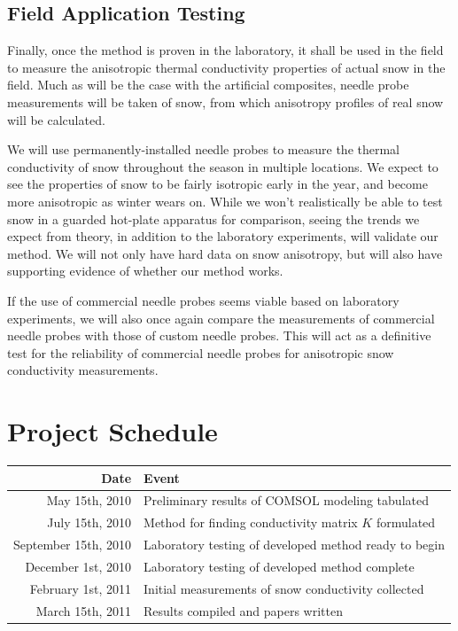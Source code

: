 \documentclass[12pt, letterpaper]{article}
\begin{document}
\subsection{Field Application Testing}

Finally, once the method is proven in the laboratory, it shall be used in the field to measure the anisotropic thermal conductivity properties of actual snow in the field. Much as will be the case with the artificial composites, needle probe measurements will be taken of snow, from which anisotropy profiles of real snow will be calculated.

We will use permanently-installed needle probes to measure the thermal conductivity of snow throughout the season in multiple locations. We expect to see the properties of snow to be fairly isotropic early in the year, and become more anisotropic as winter wears on. While we won't realistically be able to test snow in a guarded hot-plate apparatus for comparison, seeing the trends we expect from theory, in addition to the laboratory experiments, will validate our method. We will not only have hard data on snow anisotropy, but will also have supporting evidence of whether our method works.

If the use of commercial needle probes seems viable based on laboratory experiments, we will also once again compare the measurements of commercial needle probes with those of custom needle probes. This will act as a definitive test for the reliability of commercial needle probes for anisotropic snow conductivity measurements.

\pagebreak
\nocite{*}



\pagebreak

\section*{Project Schedule}
\begin{center}
\begin{tabular}{r | l}
Date & Event\\
\hline
May 15th, 2010 & Preliminary results of COMSOL modeling tabulated\\
July 15th, 2010 & Method for finding conductivity matrix \(K\) formulated\\
September 15th, 2010 & Laboratory testing of developed method ready to begin\\
December 1st, 2010 & Laboratory testing of developed method complete\\
February 1st, 2011 & Initial measurements of snow conductivity collected\\
March 15th, 2011 & Results compiled and papers written
\end{tabular}
\end{center}
\end{document}
